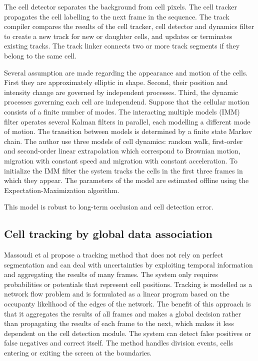 The cell detector separates the background from cell pixels. The cell tracker propagates the cell labelling to the next frame in the sequence. The track compiler compares the results of the cell tracker, cell detector and dynamics filter to create a new track for new or daughter cells, and updates or terminates existing tracks. The track linker connects two or more track segments if they belong to the same cell. 

Several assumption are made regarding the appearance and motion of the cells. First they are approximately elliptic in shape. Second, their position and intensity change are governed by independent processes. Third, the dynamic processes governing each cell are independend. Suppose that the cellular motion consists of a finite number of modes. The interacting multiple models (IMM) filter operates several Kalman filters in parallel, each modelling a different mode of motion. The transition between models is determined by a finite state Markov chain. The author use three models of cell dynamics: random walk, first-order and second-order linear extrapolation which correspond to Brownian motion, migration with constant speed and migration with constant acceleration. To initialize the IMM filter the system tracks the cells in the first three frames in which they appear. The parameters of the model are estimated offline using the Expectation-Maximization algorithm.

This model is robust to long-term occlusion and cell detection error.

\subsection{Cell tracking by global data association}

Massoudi et al \cite{massoudi12} propose a tracking method that does not rely on perfect segmentation and can deal with uncertainties by exploiting temporal information and aggregating the results of many frames. The system only requires probabilities or potentials that represent cell positions. Tracking is modelled as a network flow problem and is formulated as a linear program based on the occupanty likelihood of the edges of the network. The benefit of this approach is that it aggregates the results of all frames and makes a global decision rather than propagating the results of each frame to the next, which makes it less dependent on the cell detection module. The system can detect false positives or false negatives and correct itself. The method handles division events, cells entering or exiting the screen at the boundaries.


